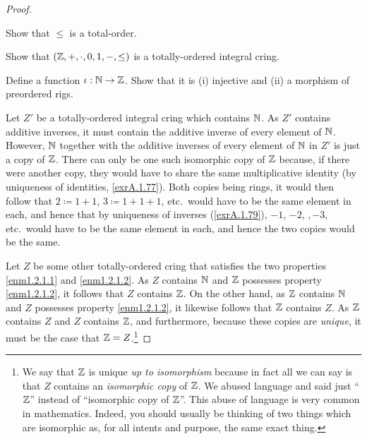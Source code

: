 \begin{thm}[Integers]
\begin{savenotes}
\begin{proof}
\begin{exr}
Show that $\leq$ is a total-order.
\end{exr}

\begin{exr}
Show that $(\mathbb{Z} ,+,\cdot ,0,1,-,\leq )$ is a totally-ordered integral cring.
\end{exr}

\begin{exr}
Define a function $\iota :\mathbb{N} \rightarrow \mathbb{Z}$.  Show that it is (i) injective and (ii) a morphism of preordered rigs.
\end{exr}

Let $Z'$ be a totally-ordered integral cring which contains $\mathbb{N}$.  As $Z'$ contains additive inverses, it must contain the additive inverse of every element of $\mathbb{N}$.  However, $\mathbb{N}$ together with the additive inverses of every element of $\mathbb{N}$ in $Z'$ is just a copy of $\mathbb{Z}$.  There can only be one such isomorphic copy of $\mathbb{Z}$ because, if there were another copy, they would have to share the same multiplicative identity (by uniqueness of identities, \cref{exrA.1.77}).  Both copies being rings, it would then follow that $2\coloneqq 1+1$, $3\coloneqq 1+1+1$, etc.~would have to be the same element in each, and hence that by uniqueness of inverses (\cref{exrA.1.79}), $-1$, $-2$, $,-3$, etc.~would have to be the same element in each, and hence the two copies would be the same.

Let $Z$ be some other totally-ordered cring that satisfies the two properties \ref{enm1.2.1.1} and \ref{enm1.2.1.2}.  As $Z$ contains $\mathbb{N}$ and $\mathbb{Z}$ possesses property \ref{enm1.2.1.2}, it follows that $Z$ contains $\mathbb{Z}$.  On the other hand, as $\mathbb{Z}$ contains $\mathbb{N}$ and $Z$ possesses property \ref{enm1.2.1.2}, it likewise follows that $\mathbb{Z}$ contains $Z$.  As $\mathbb{Z}$ contains $Z$ and $Z$ contains $\mathbb{Z}$, and furthermore, because these copies are \emph{unique}, it must be the case that $\mathbb{Z} =Z$.\footnote{We say that $\mathbb{Z}$ is unique \emph{up to isomorphism} because in fact all we can say is that $Z$ contains an \emph{isomorphic copy} of $\mathbb{Z}$.  We abused language and said just ``$\mathbb{Z}$'' instead of ``isomorphic copy of $\mathbb{Z}$''.  This abuse of language is very common in mathematics.  Indeed, you should usually be thinking of two things which are isomorphic as, for all intents and purpose, the same exact thing.}
\end{proof}
\end{savenotes}
\end{thm}

